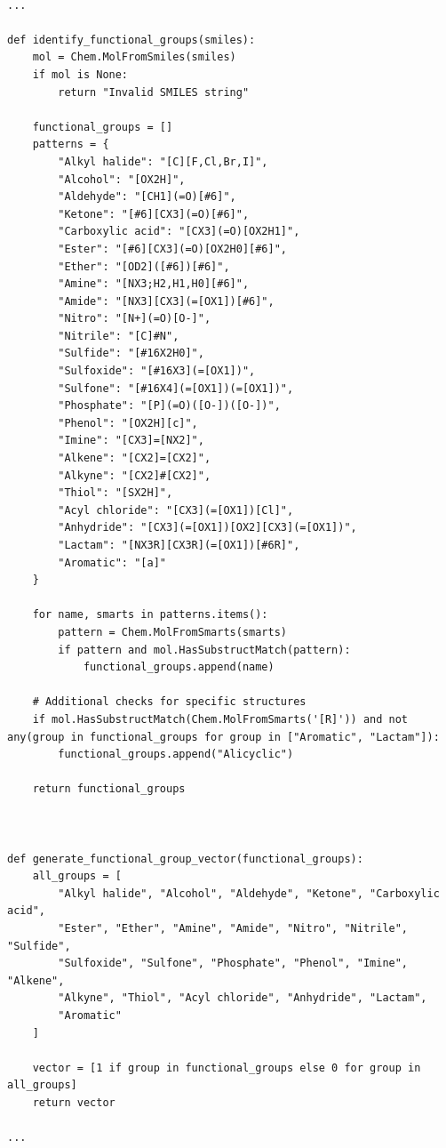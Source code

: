 \documentclass[11pt,a4paper]{article}
\begin{document}
\begin{verbatim}

...

def identify_functional_groups(smiles):
    mol = Chem.MolFromSmiles(smiles)
    if mol is None:
        return "Invalid SMILES string"

    functional_groups = []
    patterns = {
        "Alkyl halide": "[C][F,Cl,Br,I]",
        "Alcohol": "[OX2H]",
        "Aldehyde": "[CH1](=O)[#6]",
        "Ketone": "[#6][CX3](=O)[#6]",
        "Carboxylic acid": "[CX3](=O)[OX2H1]",
        "Ester": "[#6][CX3](=O)[OX2H0][#6]",
        "Ether": "[OD2]([#6])[#6]",
        "Amine": "[NX3;H2,H1,H0][#6]",
        "Amide": "[NX3][CX3](=[OX1])[#6]",
        "Nitro": "[N+](=O)[O-]",
        "Nitrile": "[C]#N",
        "Sulfide": "[#16X2H0]",
        "Sulfoxide": "[#16X3](=[OX1])",
        "Sulfone": "[#16X4](=[OX1])(=[OX1])",
        "Phosphate": "[P](=O)([O-])([O-])",
        "Phenol": "[OX2H][c]",
        "Imine": "[CX3]=[NX2]",
        "Alkene": "[CX2]=[CX2]",
        "Alkyne": "[CX2]#[CX2]",
        "Thiol": "[SX2H]",
        "Acyl chloride": "[CX3](=[OX1])[Cl]",
        "Anhydride": "[CX3](=[OX1])[OX2][CX3](=[OX1])",
        "Lactam": "[NX3R][CX3R](=[OX1])[#6R]",
        "Aromatic": "[a]"
    }

    for name, smarts in patterns.items():
        pattern = Chem.MolFromSmarts(smarts)
        if pattern and mol.HasSubstructMatch(pattern):
            functional_groups.append(name)

    # Additional checks for specific structures
    if mol.HasSubstructMatch(Chem.MolFromSmarts('[R]')) and not any(group in functional_groups for group in ["Aromatic", "Lactam"]):
        functional_groups.append("Alicyclic")

    return functional_groups



def generate_functional_group_vector(functional_groups):
    all_groups = [
        "Alkyl halide", "Alcohol", "Aldehyde", "Ketone", "Carboxylic acid",
        "Ester", "Ether", "Amine", "Amide", "Nitro", "Nitrile", "Sulfide", 
        "Sulfoxide", "Sulfone", "Phosphate", "Phenol", "Imine", "Alkene", 
        "Alkyne", "Thiol", "Acyl chloride", "Anhydride", "Lactam", 
        "Aromatic"
    ]
    
    vector = [1 if group in functional_groups else 0 for group in all_groups]
    return vector

...

\end{verbatim}
\end{document}
